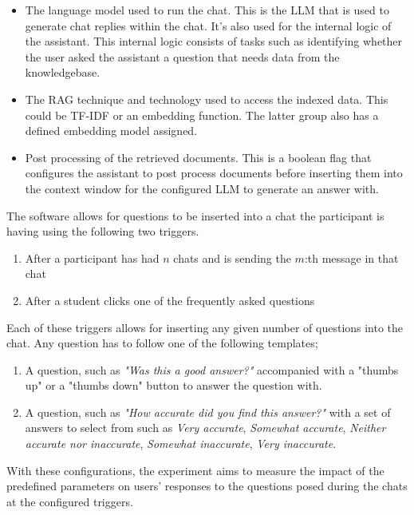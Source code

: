 \begin{itemize}
        \item The language model used to run the chat. This is the \gls{LLM} that is used to generate chat replies within the chat. It’s also used for the internal logic of the assistant. This internal logic consists of tasks such as identifying whether the user asked the assistant a question that needs data from the knowledgebase.
        \item The \gls{RAG} technique and technology used to access the indexed data. This could be \gls{TF-IDF} or an embedding function. The latter group also has a defined embedding model assigned.
        \item Post processing of the retrieved documents. This is a boolean flag that configures the assistant to post process documents before inserting them into the context window for the configured \gls{LLM} to generate an answer with.
\end{itemize}


The software allows for questions to be inserted into a chat the participant is having using the following two triggers.


\begin{enumerate}
        \item After a participant has had $n$ chats and is sending the $m$:th message in that chat
        \item After a student clicks one of the frequently asked questions
\end{enumerate}


Each of these triggers allows for inserting any given number of questions into the chat. Any question has to follow one of the following templates;


\begin{enumerate}[label=\alph*)]
        \item A question, such as \textit{"Was this a good answer?"} accompanied with a "thumbs up" or a "thumbs down" button to answer the question with.
        \item A question, such as \textit{"How accurate did you find this answer?"} with a set of answers to select from such as \textit{Very accurate}, \textit{Somewhat accurate}, \textit{Neither accurate nor inaccurate}, \textit{Somewhat inaccurate}, \textit{Very inaccurate}.
\end{enumerate}


With these configurations, the experiment aims to measure the impact of the predefined parameters on users' responses to the questions posed during the chats at the configured triggers.


